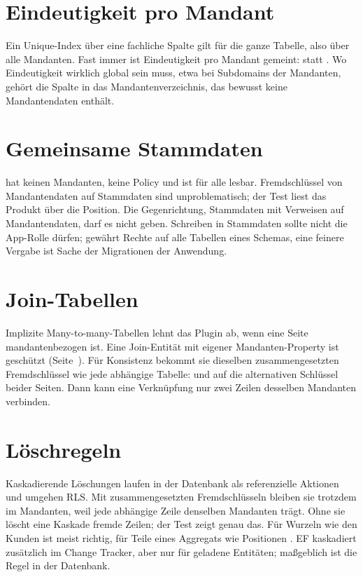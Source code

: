 \section{Eindeutigkeit pro Mandant}

Ein Unique-Index über eine fachliche Spalte gilt für die ganze Tabelle, also über alle
Mandanten. Fast immer ist Eindeutigkeit pro Mandant gemeint:  statt
. Wo Eindeutigkeit wirklich global sein muss, etwa bei Subdomains der Mandanten,
gehört die Spalte in das Mandantenverzeichnis, das bewusst keine Mandantendaten enthält.

\section{Gemeinsame Stammdaten}

 hat keinen Mandanten, keine Policy und ist für alle lesbar. Fremdschlüssel von
Mandantendaten auf Stammdaten sind unproblematisch; der Test liest das Produkt über die Position.
Die Gegenrichtung, Stammdaten mit Verweisen auf Mandantendaten, darf es nicht geben. Schreiben
in Stammdaten sollte nicht die App-Rolle dürfen; 
gewährt Rechte auf alle Tabellen eines Schemas, eine feinere Vergabe ist Sache der Migrationen
der Anwendung.

\section{Join-Tabellen}

Implizite Many-to-many-Tabellen lehnt das Plugin ab, wenn eine Seite mandantenbezogen ist. Eine
Join-Entität mit eigener Mandanten-Property ist geschützt
(Seite~\pageref{sec:supported-table-mappings}). Für Konsistenz bekommt sie dieselben
zusammengesetzten Fremdschlüssel wie jede abhängige Tabelle:  und
 auf die alternativen Schlüssel beider Seiten. Dann kann eine
Verknüpfung nur zwei Zeilen desselben Mandanten verbinden.

\section{Löschregeln}

Kaskadierende Löschungen laufen in der Datenbank als referenzielle Aktionen und umgehen RLS.
Mit zusammengesetzten Fremdschlüsseln bleiben sie trotzdem im Mandanten, weil jede abhängige
Zeile denselben Mandanten trägt. Ohne sie löscht eine Kaskade fremde Zeilen; der Test
zeigt genau das. Für Wurzeln wie den Kunden ist  meist richtig, für Teile eines
Aggregats wie Positionen . EF kaskadiert zusätzlich im Change Tracker, aber nur
für geladene Entitäten; maßgeblich ist die Regel in der Datenbank.


